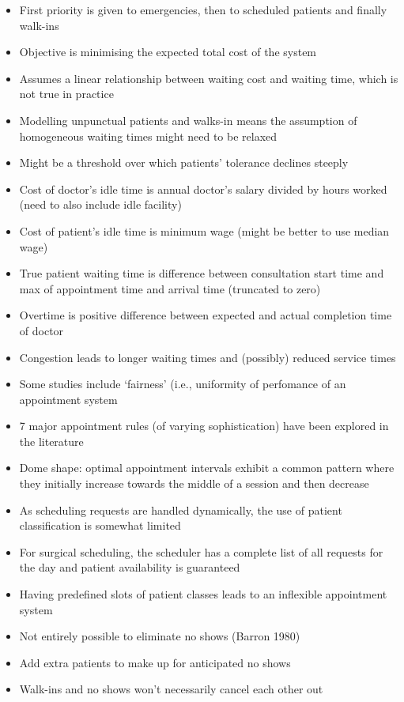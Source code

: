\documentclass{article}
\begin{document}
\begin{itemize}
    \item First priority is given to emergencies, then to scheduled patients and finally walk-ins
    \item Objective is minimising the expected total cost of the system
    \item Assumes a linear relationship between waiting cost and waiting time, which is not true in practice
    \item Modelling unpunctual patients and walks-in means the assumption of homogeneous waiting times might need to be relaxed
    \item Might be a threshold over which patients' tolerance declines steeply
    \item Cost of doctor's idle time is annual doctor's salary divided by hours worked (need to also include idle facility)
    \item Cost of patient's idle time is minimum wage (might be better to use median wage)
    \item True patient waiting time is difference between consultation start time and max of appointment time and arrival time (truncated to zero)
    \item Overtime is positive difference between expected and actual completion time of doctor
    \item Congestion leads to longer waiting times and (possibly) reduced service times
    \item Some studies include `fairness' (i.e., uniformity of perfomance of an appointment system
    \item 7 major appointment rules (of varying sophistication) have been explored in the literature
    \item Dome shape: optimal appointment intervals exhibit a common pattern where they initially increase towards the middle of a session and then decrease
    \item As scheduling requests are handled dynamically, the use of patient classification is somewhat limited
    \item For surgical scheduling, the scheduler has a complete list of all requests for the day and patient availability is guaranteed
    \item Having predefined slots of patient classes leads to an inflexible appointment system
    \item Not entirely possible to eliminate no shows (Barron 1980)
    \item Add extra patients to make up for anticipated no shows
    \item Walk-ins and no shows won't necessarily cancel each other out

\end{itemize}
\end{document}

